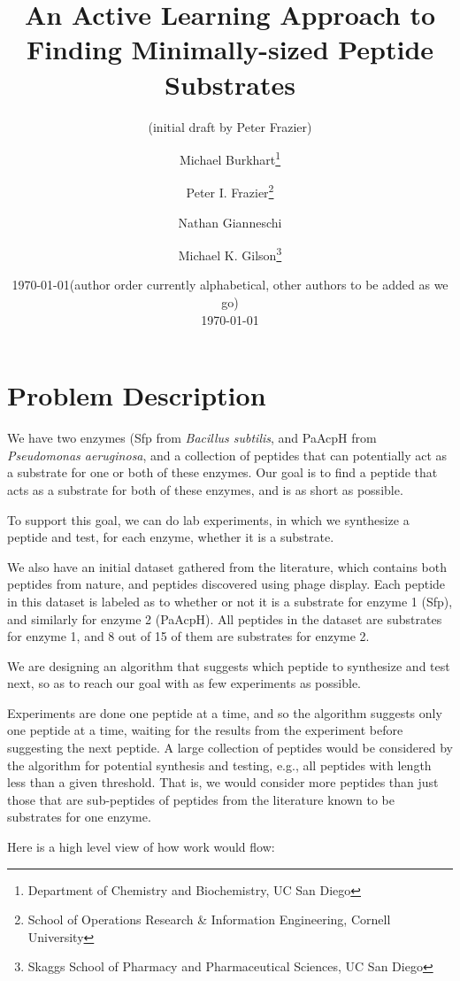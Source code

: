 \documentclass[12pt]{article}
\title{An Active Learning Approach to Finding Minimally-sized Peptide Substrates}
\date{\today}
\author{(initial draft by Peter Frazier)} %
\author{
Michael Burkhart\thanks{Department of Chemistry and Biochemistry, UC San Diego} \and
Peter I. Frazier\thanks{School of Operations Research \& Information Engineering, Cornell University} \and
Nathan Gianneschi\footnotemark[1] \and
Michael K. Gilson\thanks{Skaggs School of Pharmacy and Pharmaceutical Sciences, UC San Diego}
}
\date{(author order currently alphabetical, other authors to be added as we go)\\ \today}
\begin{document}
\maketitle

\section{Problem Description}

We have two enzymes (Sfp from {\it Bacillus subtilis}, and PaAcpH from {\it Pseudomonas aeruginosa}, and a collection of peptides that can potentially act as a substrate for one or both of these enzymes.  Our goal is to find a peptide that acts as a substrate for both of these enzymes, and is as short as possible.

To support this goal, we can do lab experiments, in which we synthesize a peptide and test, for each enzyme, whether it is a substrate.

We also have an initial dataset gathered from the literature, %
which contains both peptides from nature, and peptides discovered using phage display.
Each peptide in this dataset is labeled as to whether or not it is a substrate for enzyme 1 (Sfp), and similarly for enzyme 2 (PaAcpH).
All peptides in the dataset are substrates for enzyme 1, and 8 out of 15 of them are substrates for enzyme 2.

We are designing an algorithm that suggests which peptide to synthesize and test next, so as to reach our goal with as few experiments as possible.

Experiments are done one peptide at a time, and so the algorithm suggests only one peptide at a time, waiting for the results from the experiment before suggesting the next peptide.
A large collection of peptides would be considered by the algorithm for potential synthesis and testing, e.g., all peptides with length less than a given threshold.  That is, we would consider more peptides than just those that are sub-peptides of peptides from the literature known to be substrates for one enzyme.

Here is a high level view of how work would flow:
\end{document}
